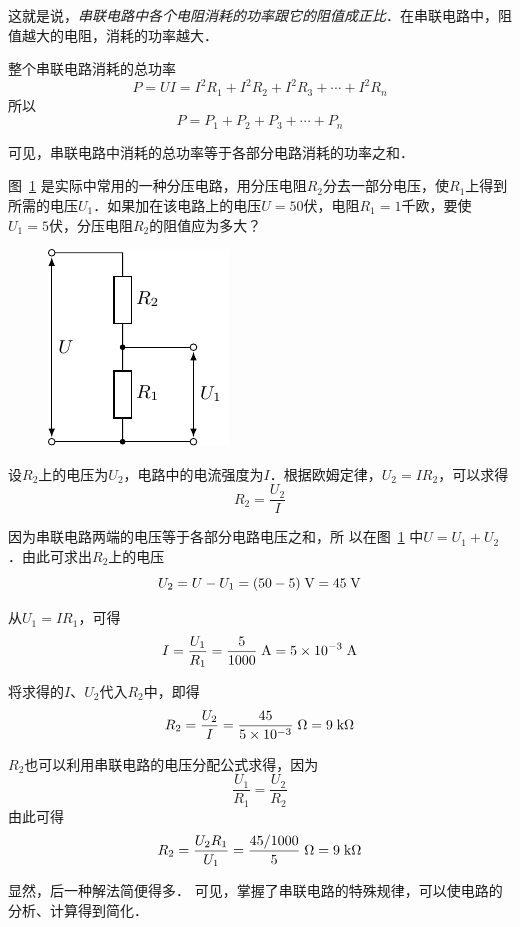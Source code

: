 这就是说，\textit{串联电路中各个电阻消耗的功率跟它的阻值成正比}．在串联电路中，阻值越大的电阻，消耗的功率越大．

整个串联电路消耗的总功率
\[P=UI=I^2R_1 +I^2R_2+I^2R_3+\cdots+I^2R_n
\]
所以
\[P=P_1+P_2+P_3+\cdots +P_n\]

可见，串联电路中消耗的总功率等于各部分电路消耗的功率之和．



\begin{example}
    图~\ref{fig_B_7-8} 是实际中常用的一种分压电路，用分压电阻$R_2$分去一部分电压，使$R_1$上得到所需的电压$U_1$．如果加在该电路上的电压$U=50$伏，电阻$R_1=1$千欧，要使$U_1=
    5$伏，分压电阻$R_2$的阻值应为多大？
\end{example}

\begin{figure}[htbp]
	\centering
	\includegraphics{fig/B/7-8.pdf}
	\caption{}\label{fig_B_7-8}
\end{figure}

\begin{solution}
    设$R_2$上的电压为$U_2$，电路中的电流强度为$I$．根据欧姆定律，$U_2=IR_2$，可以求得
    \[R_2=\frac{U_2}{I}\]

因为串联电路两端的电压等于各部分电路电压之和，所
以在图~\ref{fig_B_7-8} 中$U=U_1+U_2$．由此可求出$R_2$上的电压
\[U_2=U-U_1=(50-5) \;\text{V} =45 \;\text{V}\]

从$U_1=IR_1$，可得
\[ I=\frac{U_1}{R_1}=\frac{5}{1000} \;\text{A} =5\times10^{-3} \;\text{A}\]

将求得的$I$、$U_2$代入$R_2$中，即得
\[R_2=\frac{U_2}{I}=\frac{45}{5\times10^{-3}} \;\Omega =9\;\text{k}\Omega\]

$R_2$也可以利用串联电路的电压分配公式求得，因为
\[\frac{U_1}{R_1}=\frac{U_2}{R_2}\]
由此可得
\[R_2=\frac{U_2R_1}{U_1}=\frac{45/1000}{5}\;\Omega=9\;\text{k}\Omega \]
\end{solution}

显然，后一种解法简便得多．
可见，掌握了串联电路的特殊规律，可以使电路的分析、计算得到简化．

